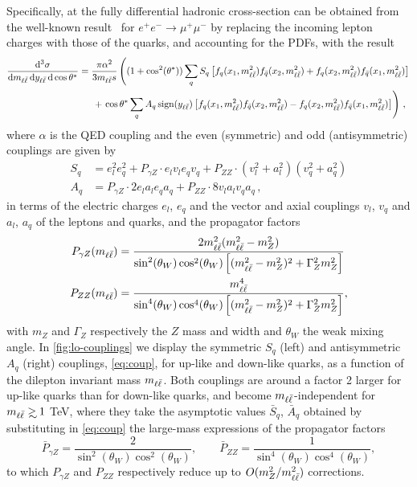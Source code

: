 Specifically, at \lo the fully differential hadronic cross-section can
be obtained from the well-known result~\cite{Peskin:1995ev} for
$e^+e^-\to\mu^+\mu^-$ by replacing the incoming lepton charges  with
those of the quarks, and accounting for the PDFs, with
the result
\begin{align}
    \frac{\dd^3 \sigma}{\dd m_{\ell\bar{\ell}} \, \dd y_{\ell\bar{\ell}} \, \dd\cos\theta^*} &= \frac{\pi \alpha^2}{3 m_{\ell\bar{\ell}} s} \left((1+\cos^2({\theta^*})) \sum_q S_q \left[f_q(x_1,m_{\ell\bar{\ell}}^2) f_{\bar{q}}(x_2,m_{\ell\bar{\ell}}^2) + f_q(x_2,m_{\ell\bar{\ell}}^2) f_{\bar{q}}(x_1,m_{\ell\bar{\ell}}^2) \right] \right. \nonumber\\
    &\hspace*{15pt} + \left. \cos\theta^* \sum_q A_q \operatorname{sign} (y_{\ell\bar{\ell}}) \left[ f_q(x_1,m_{\ell\bar{\ell}}^2) f_{\bar{q}}(x_2,m_{\ell\bar{\ell}}^2) - f_q(x_2,m_{\ell\bar{\ell}}^2) f_{\bar{q}}(x_1,m_{\ell\bar{\ell}}^2)\right] \right) \, ,
    \label{eq:lo-triple-diff}
\end{align}
where  $\alpha$ is the QED coupling and the even (symmetric) and
odd  (antisymmetric) couplings are given by
\begin{align}
  \label{eq:coup}
    S_q &= e_l^2 e_q^2 + P_{\gamma Z} \cdot  e_l v_l e_q v_q + P_{ZZ} \cdot  (v_l^2+a_l^2)(v_q^2+a_q^2) \nonumber \\
    A_q &= P_{\gamma Z} \cdot 2 e_l a_l e_q a_q  + P_{ZZ} \cdot 8 v_l a_l  v_q a_q \, ,
\end{align}
in terms of the electric charges  $e_l$, $e_q$ and the vector and
axial couplings $v_l$, $v_q$ and $a_l$, $a_q$  of the leptons and
quarks, and the propagator factors
\begin{align}\label{eq:propgz}
    P_{\gamma Z}(m_{\ell\bar{\ell}}) &= \frac{2m_{\ell\bar{\ell}}^2 (m_{\ell\bar{\ell}}^2  - m_Z^2)}{\sin^2(\theta_W) \cos^2(\theta_W)\left[(m_{\ell\bar{\ell}}^2 - m_Z^2)^2 + \Gamma_Z^2 m_Z^2\right]}\\
\label{eq:propzz}
    P_{ZZ}(m_{\ell\bar{\ell}}) &= \frac{m_{\ell\bar{\ell}}^4}{\sin^4(\theta_W) \cos^4(\theta_W)\left[(m_{\ell\bar{\ell}}^2 - m_Z^2)^2 + \Gamma_Z^2 m_Z^2\right]},
\end{align}
with $m_Z$  and $\Gamma_Z$ respectively the $Z$ mass and width and $\theta_W$ the weak mixing angle.
%
In \cref{fig:lo-couplings} we display the
symmetric $S_q$ (left) and antisymmetric $A_q$ (right)
couplings, \cref{eq:coup}, for up-like and
down-like quarks, as a function of 
the dilepton invariant mass $m_{\ell\bar{\ell}}$.
%
Both couplings are around a factor 2 larger for
up-like quarks than for down-like quarks, and
become $m_{\ell\bar{\ell}}$-independent for $\mll \gsim 1$ TeV, where they take
the asymptotic values $\bar S_q$, $\bar A_q$ obtained by
substituting in \cref{eq:coup} the large-mass expressions of
the propagator factors
\begin{equation}\label{eq:propasympt}
    \bar P_{\gamma Z} = \frac{2}{\sin^2(\theta_W)\cos^2(\theta_W)},
    \qquad 
    \bar P_{ZZ} = \frac{1}{\sin^4(\theta_W) \cos^4(\theta_W)},
\end{equation}
to which $P_{\gamma Z}$ and $P_{ZZ}$ respectively reduce up to $O(m^2_Z/m_{\ell\bar{\ell}}^2)$ corrections.


